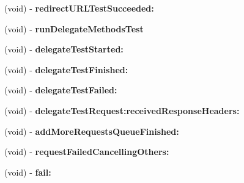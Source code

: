 \begin{DoxyCompactItemize}
\item 
\hypertarget{interface_a_s_i_network_queue_tests_07_08_a02802eb48180e644ceee78ca4840607d}{
(void) -\/ {\bfseries redirect\-U\-R\-L\-Test\-Succeeded\-:}}
\label{interface_a_s_i_network_queue_tests_07_08_a02802eb48180e644ceee78ca4840607d}

\item 
\hypertarget{interface_a_s_i_network_queue_tests_07_08_aac272d1e4ebf8932ab723637f3abe58c}{
(void) -\/ {\bfseries run\-Delegate\-Methods\-Test}}
\label{interface_a_s_i_network_queue_tests_07_08_aac272d1e4ebf8932ab723637f3abe58c}

\item 
\hypertarget{interface_a_s_i_network_queue_tests_07_08_ad63bd013de90e522e12f2bba603c20d7}{
(void) -\/ {\bfseries delegate\-Test\-Started\-:}}
\label{interface_a_s_i_network_queue_tests_07_08_ad63bd013de90e522e12f2bba603c20d7}

\item 
\hypertarget{interface_a_s_i_network_queue_tests_07_08_aa05a6ec84d2a71b363573187e70a6afa}{
(void) -\/ {\bfseries delegate\-Test\-Finished\-:}}
\label{interface_a_s_i_network_queue_tests_07_08_aa05a6ec84d2a71b363573187e70a6afa}

\item 
\hypertarget{interface_a_s_i_network_queue_tests_07_08_a3b74243c00c86e888ffc9cb271138dcb}{
(void) -\/ {\bfseries delegate\-Test\-Failed\-:}}
\label{interface_a_s_i_network_queue_tests_07_08_a3b74243c00c86e888ffc9cb271138dcb}

\item 
\hypertarget{interface_a_s_i_network_queue_tests_07_08_a46a23624618c0547cbcbb9ca82c798cb}{
(void) -\/ {\bfseries delegate\-Test\-Request\-:received\-Response\-Headers\-:}}
\label{interface_a_s_i_network_queue_tests_07_08_a46a23624618c0547cbcbb9ca82c798cb}

\item 
\hypertarget{interface_a_s_i_network_queue_tests_07_08_abe54bb28f6c58b48f2e136adebe7591c}{
(void) -\/ {\bfseries add\-More\-Requests\-Queue\-Finished\-:}}
\label{interface_a_s_i_network_queue_tests_07_08_abe54bb28f6c58b48f2e136adebe7591c}

\item 
\hypertarget{interface_a_s_i_network_queue_tests_07_08_ac13a2a0cfd430c066079f46e968de949}{
(void) -\/ {\bfseries request\-Failed\-Cancelling\-Others\-:}}
\label{interface_a_s_i_network_queue_tests_07_08_ac13a2a0cfd430c066079f46e968de949}

\item 
\hypertarget{interface_a_s_i_network_queue_tests_07_08_a672f203e09f2d4f39fb2f1824cd85443}{
(void) -\/ {\bfseries fail\-:}}
\label{interface_a_s_i_network_queue_tests_07_08_a672f203e09f2d4f39fb2f1824cd85443}


\end{DoxyCompactItemize}
